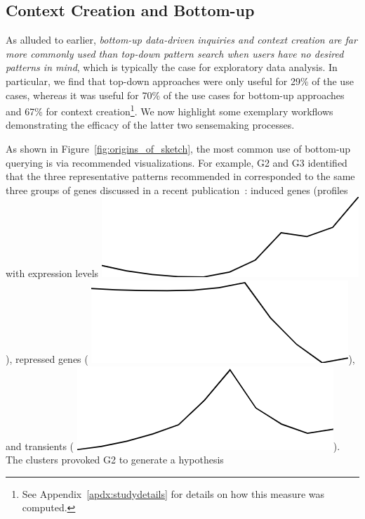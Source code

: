 \subsection{Context Creation and Bottom-up }%
\par As alluded to earlier,
\emph{bottom-up data-driven inquiries
and context creation are far more commonly
used than top-down pattern search
when users have no desired patterns in mind},
which is typically the case for exploratory data analysis.
In particular, we find that top-down approaches
were only useful for 29\% of the use cases,
whereas it was useful for 70\% of the use cases
for bottom-up approaches and 67\%
for context creation\footnote{See Appendix~\ref{apdx:studydetails} for details on how this measure was computed.}. We now highlight some exemplary workflows demonstrating the efficacy of the latter two sensemaking processes.
\par As shown in Figure~\ref{fig:origins_of_sketch},
the most common use of bottom-up querying
is via recommended visualizations. For example, G2 and G3 identified that
the three representative patterns
recommended in \zvpp corresponded
to the same three groups of genes discussed
in a recent publication~\cite{Gloss2017}:
induced genes (profiles with expression levels  \includegraphics[width=2\baselineskip,keepaspectratio]{figures/induced.png}),
repressed genes ( \includegraphics[width=2\baselineskip,keepaspectratio]{figures/repressed.png}),
and transients ( \includegraphics[width=2\baselineskip,keepaspectratio]{figures/transient.png}). The clusters provoked G2 to generate a hypothesis
